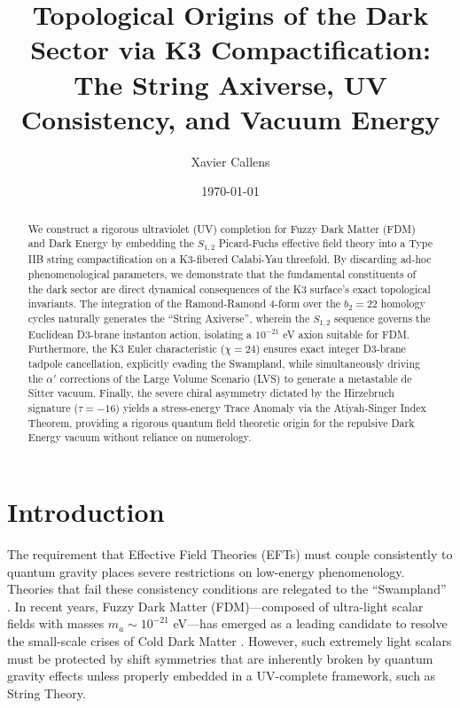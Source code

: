 \documentclass[aps,prd,twocolumn,nofootinbib,superscriptaddress,10pt]{revtex4-2}
\begin{document}
\title{Topological Origins of the Dark Sector via K3 Compactification:\\ The String Axiverse, UV Consistency, and Vacuum Energy}

\author{Xavier Callens}

\date{\today}

\begin{abstract}
We construct a rigorous ultraviolet (UV) completion for Fuzzy Dark Matter (FDM) and Dark Energy by embedding the $S_{1,2}$ Picard-Fuchs effective field theory into a Type IIB string compactification on a K3-fibered Calabi-Yau threefold. By discarding ad-hoc phenomenological parameters, we demonstrate that the fundamental constituents of the dark sector are direct dynamical consequences of the K3 surface's exact topological invariants. The integration of the Ramond-Ramond 4-form over the $b_2=22$ homology cycles naturally generates the ``String Axiverse'', wherein the $S_{1,2}$ sequence governs the Euclidean D3-brane instanton action, isolating a $10^{-21}$ eV axion suitable for FDM. Furthermore, the K3 Euler characteristic ($\chi = 24$) ensures exact integer D3-brane tadpole cancellation, explicitly evading the Swampland, while simultaneously driving the $\alpha'$ corrections of the Large Volume Scenario (LVS) to generate a metastable de Sitter vacuum. Finally, the severe chiral asymmetry dictated by the Hirzebruch signature ($\tau = -16$) yields a stress-energy Trace Anomaly via the Atiyah-Singer Index Theorem, providing a rigorous quantum field theoretic origin for the repulsive Dark Energy vacuum without reliance on numerology.
\end{abstract}

\maketitle

\section{Introduction}

The requirement that Effective Field Theories (EFTs) must couple consistently to quantum gravity places severe restrictions on low-energy phenomenology. Theories that fail these consistency conditions are relegated to the ``Swampland'' \cite{Vafa2005}. In recent years, Fuzzy Dark Matter (FDM)---composed of ultra-light scalar fields with masses $m_a \sim 10^{-21}$ eV---has emerged as a leading candidate to resolve the small-scale crises of Cold Dark Matter \cite{Hui2017}. However, such extremely light scalars must be protected by shift symmetries that are inherently broken by quantum gravity effects unless properly embedded in a UV-complete framework, such as String Theory.
\end{document}
